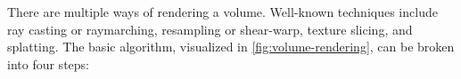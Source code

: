


There are multiple ways of rendering a volume. Well-known techniques include ray casting or raymarching, resampling or shear-warp, texture slicing, and splatting. The basic algorithm, visualized in \autoref{fig:volume-rendering}, can be broken into four steps:


